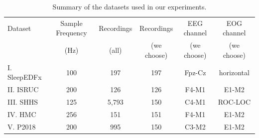 \documentclass[letterpaper]{article} %
\begin{document}
	\begin{table}[tb]
		\centering
		\small
		\begin{tabular}{lccccc}
			\toprule
			Dataset&Sample Frequency &Recordings&Recordings&EEG channel&EOG channel\\
			&(Hz)&(all)&(we choose)&(we choose)&(we choose)\\
			\midrule
			I. SleepEDFx&100&197&197&Fpz-Cz&horizontal\\
			II. ISRUC&200&126&126&F4-M1&E1-M2\\
			III. SHHS&125&5,793&150&C4-M1&ROC-LOC\\
			IV. HMC&256&151&151&F4-M1&E1-M2\\
			V. P2018&200&995&150&C3-M2&E1-M2\\
			\bottomrule
		\end{tabular}
		\caption{Summary of the datasets used in our experiments.}\label{tab:datasets}
	\end{table}
\end{document}
